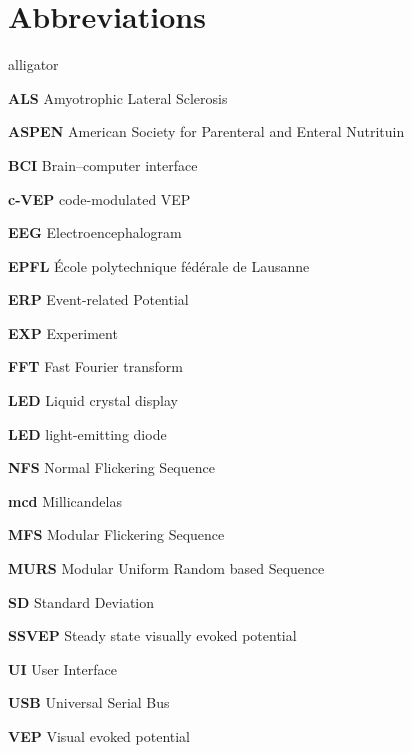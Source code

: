 \chapter*{Abbreviations}
\begin{labeling}{alligator}
	\item[\textbf{ALS}]	Amyotrophic Lateral Sclerosis
	\item[\textbf{ASPEN}] American Society for Parenteral and Enteral Nutrituin
	\item[\textbf{BCI}] Brain–computer interface
	\item[\textbf{c-VEP}] code-modulated VEP
	\item[\textbf{EEG}] Electroencephalogram
	\item[\textbf{EPFL}] École polytechnique fédérale de Lausanne
	\item[\textbf{ERP}] Event-related Potential
	\item[\textbf{EXP}] Experiment
	\item[\textbf{FFT}] Fast Fourier transform
	\item[\textbf{LED}] Liquid crystal display
	\item[\textbf{LED}] light-emitting diode
	\item[\textbf{NFS}] Normal Flickering Sequence 
	\item[\textbf{mcd}] Millicandelas 
	\item[\textbf{MFS}] Modular Flickering Sequence 
	\item[\textbf{MURS}] Modular Uniform Random based Sequence 
	\item[\textbf{SD}] Standard Deviation
	\item[\textbf{SSVEP}] Steady state visually evoked potential
	\item[\textbf{UI}] User Interface
	\item[\textbf{USB}] Universal Serial Bus
	\item[\textbf{VEP}] Visual evoked potential
	
\end{labeling}